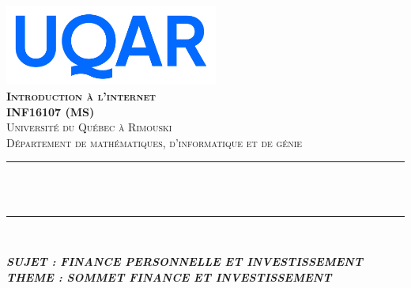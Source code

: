 \begin{titlepage}

\newcommand{\HRule}{\rule{\linewidth}{0.5mm}} %


\begin{center} %


\includegraphics[width=7cm]{uqar}\\[1.5cm] 
\textbf{\textsc{\Large Introduction à l'internet \\ \vspace{0.5cm} INF16107 (MS)}}\\[1.0cm] 
\textsc{\Large Université du Québec à Rimouski}\\[0.5cm] 
\textsc{\large Département de mathématiques, d'informatique et de génie}\\[0.95cm] 


\HRule \\ %
{ \huge \bfseries \reporttitle}\\ %
\HRule \\[1.5cm]
\end{center}
\textit{\textsc{\textbf{SUJET : FINANCE PERSONNELLE ET INVESTISSEMENT}}}\\[0.5cm]
\textit{\textsc{\textbf{THEME : SOMMET FINANCE ET INVESTISSEMENT}}}\\


\end{titlepage}
